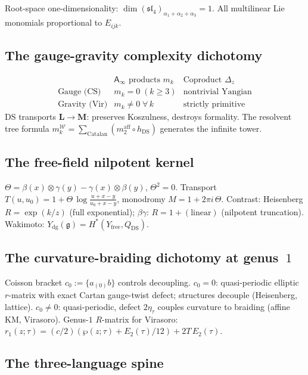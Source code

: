 \documentclass[11pt]{article}
\newcommand{\cW}{\mathcal{W}}
\newcommand{\fg}{\mathfrak{g}}
\newcommand{\Ainf}{\mathsf{A}_{\infty}}
\begin{document}
Root-space one-dimensionality:
$\dim(\mathfrak{sl}_4)_{\alpha_1+\alpha_2+\alpha_3} = 1$.
All multilinear Lie monomials proportional to $E_{ijk}$.


\subsection{The gauge-gravity complexity dichotomy}

\[
\begin{array}{c|cc}
& \Ainf\text{ products } m_k & \text{Coproduct } \Delta_z \\
\hline
\text{Gauge (CS)} & m_k = 0 \;(k \ge 3) &
  \text{nontrivial Yangian} \\
\text{Gravity (Vir)} & m_k \neq 0 \;\forall\, k &
  \text{strictly primitive}
\end{array}
\]
DS transports $\mathbf{L} \to \mathbf{M}$: preserves Koszulness,
destroys formality.  The resolvent tree formula
$m_k^{\cW} = \sum_{\text{Catalan}}(m_2^{\mathrm{aff}} \circ h_{\mathrm{DS}})$
generates the infinite tower.


\subsection{The free-field nilpotent kernel}

$\Theta = \beta(x) \otimes \gamma(y) - \gamma(x) \otimes \beta(y)$,
$\Theta^2 = 0$.
Transport $T(u,u_0) = 1 + \Theta\,\log\frac{u+x-y}{u_0+x-y}$,
monodromy $M = 1 + 2\pi i\,\Theta$.
Contrast: Heisenberg $R = \exp(k/z)$ (full exponential);
$\beta\gamma$: $R = 1 + (\text{linear})$ (nilpotent truncation).
Wakimoto: $Y_{\mathrm{dg}}(\fg) = H^*(Y_{\mathrm{free}}, Q_{\mathrm{DS}})$.


\subsection{The curvature-braiding dichotomy at genus~$1$}

Coisson bracket $c_0 := \{a{}_{(0)}b\}$ controls decoupling.
$c_0 = 0$: quasi-periodic elliptic $r$-matrix with exact
Cartan gauge-twist defect; structures decouple (Heisenberg,
lattice).
$c_0 \neq 0$: quasi-periodic, defect $2\eta_\tau$ couples
curvature to braiding (affine KM, Virasoro).
Genus-$1$ $R$-matrix for Virasoro:
$r_1(z;\tau) = (c/2)(\wp(z;\tau) + E_2(\tau)/12) + 2T\,E_2(\tau)$.


\subsection{The three-language spine}
\end{document}
